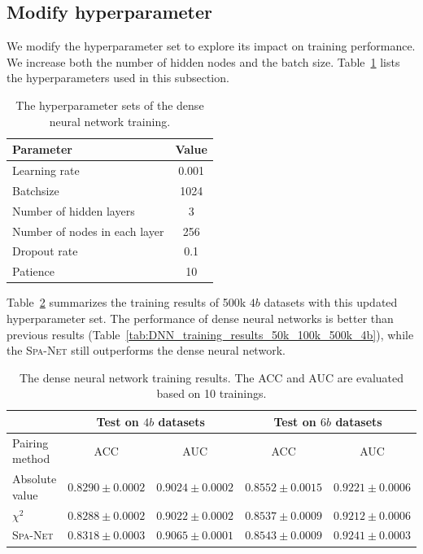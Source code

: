 \documentclass[12pt]{article}
\begin{document}
    \subsection{Modify hyperparameter}%
    \label{sub:modify_hyperparameter}
        We modify the hyperparameter set to explore its impact on training performance. We increase both the number of hidden nodes and the batch size. Table~\ref{tab:DNN_hyperparameters_2} lists the hyperparameters used in this subsection.
        \begin{table}[htpb]
            \centering
            \caption{The hyperparameter sets of the dense neural network training.}
            \label{tab:DNN_hyperparameters_2}
            \begin{tabular}{l|c}
            Parameter                     & Value \\ \hline
            Learning rate                 & 0.001 \\
            Batchsize                     & 1024  \\
            Number of hidden layers       & 3     \\
            Number of nodes in each layer & 256   \\
            Dropout rate                  & 0.1   \\
            Patience                      & 10
            \end{tabular}
        \end{table}

        Table~\ref{tab:DNN_training_results_500k_4b_256_nodes} summarizes the training results of 500k $4b$ datasets with this updated hyperparameter set. The performance of dense neural networks is better than previous results (Table~\ref{tab:DNN_training_results_50k_100k_500k_4b}), while the \textsc{Spa-Net} still outperforms the dense neural network.
        \begin{table}[htpb]
            \centering
            \caption{The dense neural network training results. The ACC and AUC are evaluated based on 10 trainings.}
            \label{tab:DNN_training_results_500k_4b_256_nodes}
            \begin{tabular}{l|cc|cc}
                             & \multicolumn{2}{c|}{Test on $4b$ datasets}& \multicolumn{2}{c}{Test on $6b$ datasets} \\ \hline
            Pairing method   & ACC                 & AUC                 & ACC                 & AUC                 \\ \hline
            Absolute value   & $0.8290 \pm 0.0002$ & $0.9024 \pm 0.0002$ & $0.8552 \pm 0.0015$ & $0.9221 \pm 0.0006$ \\
            $\chi^2$         & $0.8288 \pm 0.0002$ & $0.9022 \pm 0.0002$ & $0.8537 \pm 0.0009$ & $0.9212 \pm 0.0006$ \\
            \textsc{Spa-Net} & $0.8318 \pm 0.0003$ & $0.9065 \pm 0.0001$ & $0.8543 \pm 0.0009$ & $0.9241 \pm 0.0003$
            \end{tabular}
        \end{table}
\end{document}
